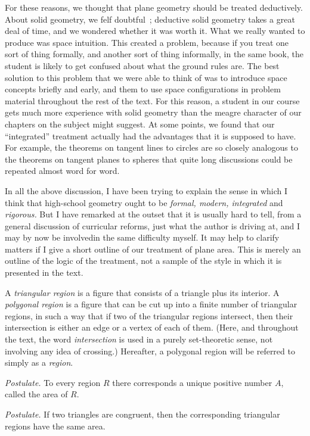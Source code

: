 For these reasons, we thought that plane geometry should be treated
deductively. About solid geometry, we felf doubtful~; deductive solid
geometry takes a great deal of time, and we wondered whether it was
worth it. What we really wanted to produce was space intuition. This
created a problem, because if you treat one sort of thing formally,
and another sort of thing informally, in the same book, the student is
likely to get confused about what the ground rules are. The best
solution to this problem that we were able to think of was to
introduce space concepts briefly and early, and them to use space
configurations in problem material throughout the rest of the
text. For this reason, a student in our course gets much more
experience with solid geometry than the meagre character of our
chapters on the subject might suggest. At some points, we found that
our ``integrated'' treatment actually had the advantages that it is
supposed to have. For example, the theorems on tangent lines to
circles are so closely analogous to the theorems on tangent planes to
spheres that quite long discussions could be repeated almost word for
word.

In all the above discussion, I have been trying to explain the sense
in which I think that high-school geometry ought to be \textit{formal,
modern, integrated} and \textit{rigorous.} But I have remarked at the
outset that it is usually hard to tell, from a general discussion of
curricular reforms, just what the author is driving at, and I may by
now be involved\pageoriginale in the same difficulty myself. It may
help to clarify matters if I give a short outline of our treatment of
plane area. This is merely an outline of the logic of the treatment,
not a sample of the style in which it is presented in the text.

A \textit{triangular region} is a figure that consists of a triangle
plus its interior. A \textit{polygonal region} is a figure that can be
cut up into a finite number of triangular regions, in such a way that
if two of the triangular regions intersect, then their intersection is
either an edge or a vertex of each of them. (Here, and throughout the
text, the word \textit{intersection} is used in a purely set-theoretic
sense, not involving any idea of crossing.) Hereafter, a polygonal
region will be referred to simply as a \textit{region}.

\textit{Postulate.} To every region $R$ there corresponds a unique
positive number $A$, called the area of $R$.

\textit{Postulate.} If two triangles are congruent, then the
corresponding triangular regions have the same area.

